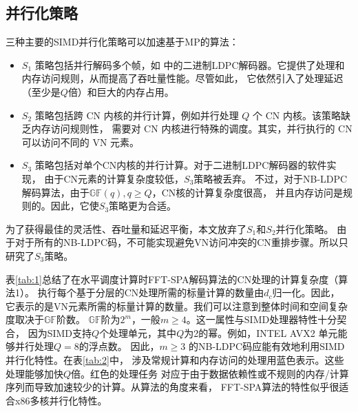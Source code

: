 \documentclass{cjc}
\begin{document}
\subsection{并行化策略}

三种主要的SIMD并行化策略可以加速基于MP的算法：
\begin{itemize}
  \item $S_1$ 策略包括并行解码多个帧，如\cite{gal_high-throughput_2016,gronroos_efficient_2012}
  中的二进制LDPC解码器。它提供了处理和内存访问规则，从而提高了吞吐量性能。尽管如此，
  它依然引入了处理延迟（至少是$Q$倍）和巨大的内存占用。
  \item $S_2$ 策略包括跨 CN 内核的并行计算，例如并行处理 $Q$ 个 CN 内核。该策略缺乏内存访问规则性，
  需要对 CN 内核进行特殊的调度。其实，并行执行的 CN 可以访问不同的 VN 元素。
  \item $S_3$ 策略包括对单个CN内核的并行计算。对于二进制LDPC解码器的软件实现，
  由于CN元素的计算复杂度较低，$S_3$策略被丢弃\cite{gal_high-throughput_2016}。
  不过，对于NB-LDPC解码算法，由于$\mathbb{GF}(q),q\geq{Q}$，CN核的计算复杂度很高，
  并且内存访问是规则的。因此，它使$S_3$策略更为合适。
\end{itemize}

  为了获得最佳的灵活性、吞吐量和延迟平衡，本文放弃了$S_1$和$S_2$并行化策略。
  由于对于所有的NB-LDPC码，不可能实现避免VN访问冲突的CN重排步骤。所以只研究了$S_3$策略。

  表\ref{tab:1}总结了在水平调度计算时FFT-SPA解码算法的CN处理的计算复杂度（算法1）。
  执行每个基于分层的CN处理所需的标量计算的数量由$d_c$归一化。因此，
  它表示的是VN元素所需的标量计算的数量。我们可以注意到整体时间和空间复杂度取决于$\mathbb{GF}$阶数。
  $\mathbb{GF}$阶为$2^m$，一般$m\geq4$。这一属性与SIMD处理器特性十分契合，
  因为SIMD支持$Q$个处理单元，其中$Q$为2的幂。例如，INTEL AVX2 单元能够并行处理$Q=8$的浮点数。
  因此，$m\geq3$ 的NB-LDPC码应能有效地利用SIMD并行化特性。在表\ref{tab:2}中，
  涉及常规计算和内存访问的处理用蓝色表示。这些处理能够加快$Q$倍。红色的处理任务
  对应于由于数据依赖性或不规则的内存/计算序列而导致加速较少的计算。从算法的角度来看，
  FFT-SPA算法的特性似乎很适合x86多核并行化特性。
\end{document}
